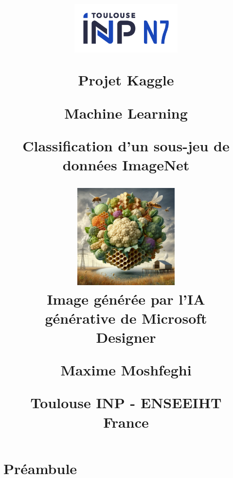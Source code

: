 \documentclass{report}
\title{
    \vspace*{-4cm} %

    \begin{figure}[H]
        \centering
        \includegraphics[width=0.5\textwidth]{Sources/Logos/Logo_ENSEEIHT.png}
        \label{fig:Logo_ENSEEIHT}
    \end{figure}
    
    \vspace*{0.5cm}
    
    Projet Kaggle
    
    \vspace{1.3cm}
    
    \textbf{Machine Learning}
    
    \vspace{0.7cm}
    
    {\huge Classification d'un sous-jeu de données ImageNet}

    \vspace{1.0cm}

    \begin{figure}[H]
        \centering
        \includegraphics[width=0.47\textwidth]{Sources/Couverture/Generated_mix.jpeg}
        \caption*{Image générée par l'IA générative de Microsoft Designer}
        \label{fig:Couverture}
    \end{figure}

    
    {\large \textbf{Maxime Moshfeghi}}
        
    \vspace{0.5cm}
    
    Toulouse INP - ENSEEIHT\\
    France
}
\begin{document}
\begin{titlepage}

\maketitle

\end{titlepage}


\tableofcontents %

\newpage

\chapter*{Préambule}
\end{document}
